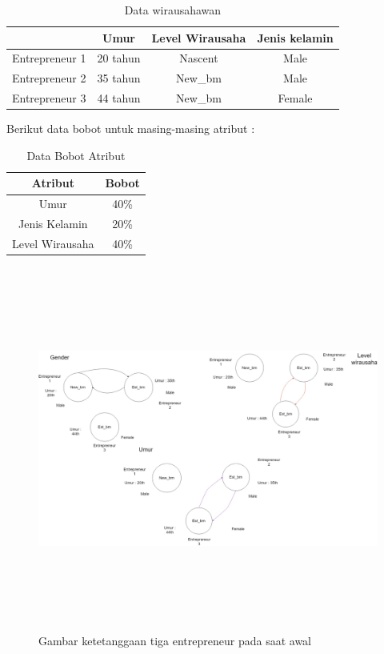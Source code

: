 \begin{table} [H]
\centering
\caption{Data wirausahawan}
\begin{tabular}{|c|c|c|c|}
\hline
& Umur & Level Wirausaha & Jenis kelamin\\
\hline
Entrepreneur 1 & 20 tahun & Nascent & Male\\
\hline
Entrepreneur 2 & 35 tahun & New\_bm & Male\\
\hline
Entrepreneur 3 & 44 tahun & New\_bm & Female\\
\hline
\end{tabular}
\end{table}

Berikut data bobot untuk masing-masing atribut :

\begin{table} [H]
\centering
\caption{Data Bobot Atribut}
\begin{tabular}{|c|c|}
\hline
Atribut & Bobot\\
\hline
Umur & 40\% \\
\hline
Jenis Kelamin & 20\% \\
\hline
Level Wirausaha & 40\% \\
\hline
\end{tabular}
\end{table}

	\begin{figure} [H]
		\centering  
		\includegraphics[width=18cm, height=12cm]{wirausahaAwal} 
		\caption[Gambar ketetanggaan tiga entrepreneur pada saat awal]{Gambar ketetanggaan tiga entrepreneur pada saat awal} 
		\label{fig:t0} 
	\end{figure}



